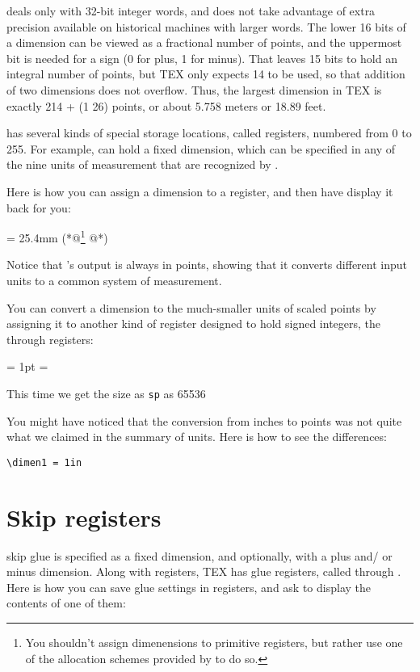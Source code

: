 \tex deals only with 32-bit integer words, and does not take advantage
of extra precision available on historical machines with larger words. The
lower 16 bits of a dimension can be viewed as a fractional number of points,
and the uppermost bit is needed for a sign (0 for plus, 1 for minus). That
leaves 15 bits to hold an integral number of points, but TEX only expects 14
to be used, so that addition of two dimensions does not overflow. Thus, the
largest dimension in TEX is exactly 214 + (1 26) points, or about 5.758  
meters or 18.89 feet. 

\tex has several kinds of special storage locations, called registers, numbered
from 0 to 255. For example, can hold a fixed dimension,
which can be specified in any of the nine units of measurement that are
recognized by \tex.

Here is how you can assign a dimension to a register, and then have \tex
display it back for you:

\begin{dispListing}
 = 25.4mm (*@\protect\footnote{You shouldn't assign dimenensions to primitive registers, but rather use one of the allocation schemes provided by \latex to do so.}  @*)
\the{}
\end{dispListing}


Notice that \tex’s output is always in points, showing that it converts different
input units to a common system of measurement.

You can convert a dimension to the much-smaller units of scaled points
by assigning it to another kind of \tex register designed to hold signed integers,
the through registers:

\begin{texexample}{}{}
\bgroup
   = 1pt
   = 
  \the{}
\egroup
\end{texexample}

{\noindent This time we get the size as \texttt{sp} as 65536 }


You might have noticed that the conversion from inches to points was not
quite what we claimed in the summary of \tex units. Here is how to see the
differences:

\verb+\dimen1 = 1in+


\section{Skip registers}
\begin{docCommand}{skip}{}
\tex glue is specified as a fixed dimension, and optionally, with a plus and/
or minus dimension. Along with  registers, TEX has glue registers,
called  through . Here is how you can save glue settings in
 registers, and ask \tex to display the contents of one of them:
\end{docCommand}

